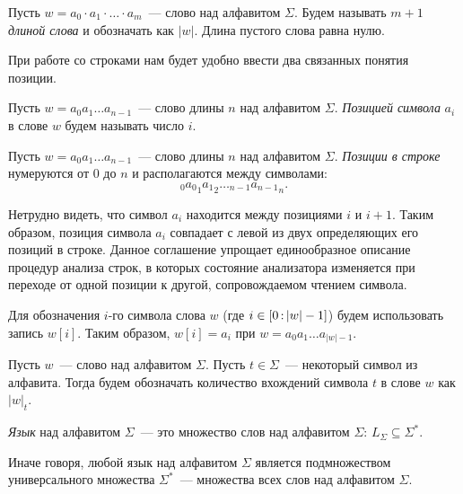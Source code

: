 \begin{definition}
    Пусть $w = a_0 \cdot a_1 \cdot \dots \cdot a_m$~--- слово над алфавитом $\Sigma$.
    Будем называть $m + 1$ \emph{длиной слова} и обозначать как $|w|$.
    Длина пустого слова равна нулю.
\end{definition}

При работе со строками нам будет удобно ввести два связанных понятия позиции.

\begin{definition}
    Пусть $w = a_0 a_1 \dots a_{n-1}$~--- слово длины $n$ над алфавитом $\Sigma$.
    \emph{Позицией символа} $a_i$ в слове $w$ будем называть число $i$.
\end{definition}

\begin{definition}
    \label{def:PositionInString}
    Пусть $w = a_0 a_1 \dots a_{n-1}$~--- слово длины $n$ над алфавитом $\Sigma$.
    \emph{Позиции в строке} нумеруются от $0$ до $n$ и располагаются между символами:
    \[
    {}_{0} {a_0}_{1} {a_1}_{2} \dots {}_{n-1} {a_{n-1}}_{n}.
    \]
\end{definition}

Нетрудно видеть, что символ $a_i$ находится между позициями $i$ и $i+1$.
Таким образом, позиция символа $a_i$ совпадает с левой из двух определяющих его позиций в строке.
Данное соглашение упрощает единообразное описание процедур анализа строк, в которых состояние анализатора изменяется при переходе от одной позиции к другой, сопровождаемом чтением символа.

Для обозначения $i$-го символа слова $w$ (где $i \in [0 \rng |w|-1]$) будем использовать запись $w[i]$. Таким образом, $w[i] = a_i$ при $w = a_0 a_1 \dots a_{|w|-1}$.

\begin{definition}
    Пусть $w$~--- слово над алфавитом $\Sigma$. Пусть $t \in \Sigma$~--- некоторый символ из алфавита.
    Тогда будем обозначать количество вхождений символа $t$ в слове $w$ как $|w|_t$.
\end{definition}

\begin{definition}[Язык]
    \emph{Язык} над алфавитом $\Sigma$~--- это множество слов над алфавитом $\Sigma$: $L_{\Sigma} \subseteq \Sigma^{*}$.
\end{definition}

Иначе говоря, любой язык над алфавитом $\Sigma$ является подмножеством универсального множества $\Sigma^*$~--- множества всех слов над алфавитом $\Sigma$.

